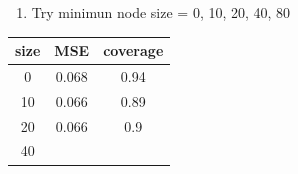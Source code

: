 \documentclass[]{article}
\providecommand{\tightlist}{%
  \setlength{\itemsep}{0pt}\setlength{\parskip}{0pt}}
\begin{document}
\begin{enumerate}
\def\labelenumi{\arabic{enumi}.}
\setcounter{enumi}{3}
\tightlist
\item
  Try minimun node size = 0, 10, 20, 40, 80
\end{enumerate}

\begin{longtable}[]{@{}ccc@{}}
\toprule
\begin{minipage}[b]{0.09\columnwidth}\centering\strut
size\strut
\end{minipage} & \begin{minipage}[b]{0.10\columnwidth}\centering\strut
MSE\strut
\end{minipage} & \begin{minipage}[b]{0.13\columnwidth}\centering\strut
coverage\strut
\end{minipage}\tabularnewline
\midrule
\endhead
\begin{minipage}[t]{0.09\columnwidth}\centering\strut
0\strut
\end{minipage} & \begin{minipage}[t]{0.10\columnwidth}\centering\strut
0.068\strut
\end{minipage} & \begin{minipage}[t]{0.13\columnwidth}\centering\strut
0.94\strut
\end{minipage}\tabularnewline
\begin{minipage}[t]{0.09\columnwidth}\centering\strut
10\strut
\end{minipage} & \begin{minipage}[t]{0.10\columnwidth}\centering\strut
0.066\strut
\end{minipage} & \begin{minipage}[t]{0.13\columnwidth}\centering\strut
0.89\strut
\end{minipage}\tabularnewline
\begin{minipage}[t]{0.09\columnwidth}\centering\strut
20\strut
\end{minipage} & \begin{minipage}[t]{0.10\columnwidth}\centering\strut
0.066\strut
\end{minipage} & \begin{minipage}[t]{0.13\columnwidth}\centering\strut
0.9\strut
\end{minipage}\tabularnewline
\begin{minipage}[t]{0.09\columnwidth}\centering\strut
40\strut
\end{minipage} & \begin{minipage}[t]{0.10\columnwidth}\centering\strut

\end{minipage}
\end{longtable}
\end{document}

